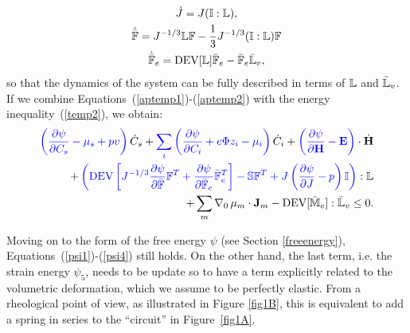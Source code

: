 \begin{gather}
\dot{J} = J (\mathbb{I}:\mathbb{L}),\\
\dot{\bar{\mathbb{F}}} = J^{-1/3} \mathbb{L} \mathbb{F} - \frac{1}{3} J^{-1/3} (\mathbb{I}:\mathbb{L}) \mathbb{F} \\
\dot{\bar{\mathbb{F}}}_e = \text{DEV}[\mathbb{L}] \bar{\mathbb{F}}_e -\bar{\mathbb{F}}_e \bar{\mathbb{L}}_v,\label{aptemp2}
\end{gather}
so that the dynamics of the system can be fully described in terms of $\mathbb{L}$ and $\bar{\mathbb{L}}_v$. If we combine Equations~(\ref{aptemp1})-(\ref{aptemp2}) with the energy inequality~(\ref{temp2}), we obtain:
\begin{equation}
\begin{aligned}
\color{blue} \left(\frac{\partial \psi}{\partial C_s}-\mu_s+p v\right)\color{black}\dot{C}_s+ \color{blue}\sum_i\left(\frac{\partial \psi}{\partial C_i} + e\Phi z_i-\mu_i\right)\color{black} \dot{C}_i
+\color{blue}\left(\frac{\partial \psi}{\partial \mathbf{H}}-\mathbf{E}\right) \color{black} \cdot \dot{\mathbf{H}}\\
+\color{blue} \left(\text{DEV}\left[J^{-1/3}\frac{\partial \psi}{\partial \bar{\mathbb{F}}}\mathbb{F}^T + \frac{\partial \psi}{\partial \bar{\mathbb{F}}_e}\bar{\mathbb{F}}_e^{T}\right]- \mathbb{S}\mathbb{F}^T +J\left(\frac{\partial \psi}{\partial J} - p\right)\mathbb{I}\right)\color{black}:\mathbb{L}\\
+ \sum_m \nabla_0 \,\mu_m \cdot \mathbf{J}_m - \text{DEV}[\mathbb{\bar{M}}_e]:\mathbb{\bar{L}}_v\leq 0 . \label{ineq2}
\end{aligned}
\end{equation}

Moving on to the form of the free energy $\psi$ (see Section \ref{freeenergy}), Equations~(\ref{psi1})-(\ref{psi4}) still holds. On the other hand, the last term, i.e. the strain energy $\psi_5$, needs to be update so to have a term explicitly related to the volumetric deformation, which we assume to be perfectly elastic. From a rheological point of view, as illustrated in Figure \ref{fig1B}, this is equivalent to add a spring in series to the \textquotedblleft circuit'' in Figure~\ref{fig1A}.

